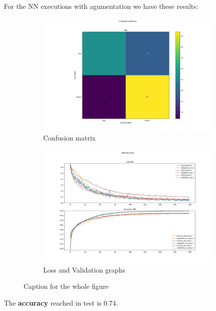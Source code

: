 \documentclass{report}
\begin{document}
For the NN executions with agumentation we have these results:
\begin{figure}[t!]
  \centering
  \hspace{-2cm}
  \begin{subfigure}[t]{0.49\textwidth}
    \centering
    \includegraphics[width=1.3\textwidth]{1.augmentationNN/conf_mat.png}
    \caption{Confusion matrix}
    \label{fig:image-set3-sub1}
  \end{subfigure}
  \hspace{-0.5cm}
  \begin{subfigure}[t]{0.49\textwidth}
    \centering
    \includegraphics[width=1.3\textwidth]{1.augmentationNN/training_infos.png}
    \caption{Loss and Validation graphs}
    \label{fig:image-set3-sub2}
  \end{subfigure}

  \caption{Caption for the whole figure}
  \label{fig:image-set3}
\end{figure}
The \textbf{accuracy} reached in test is $0.74$.\\
\end{document}
